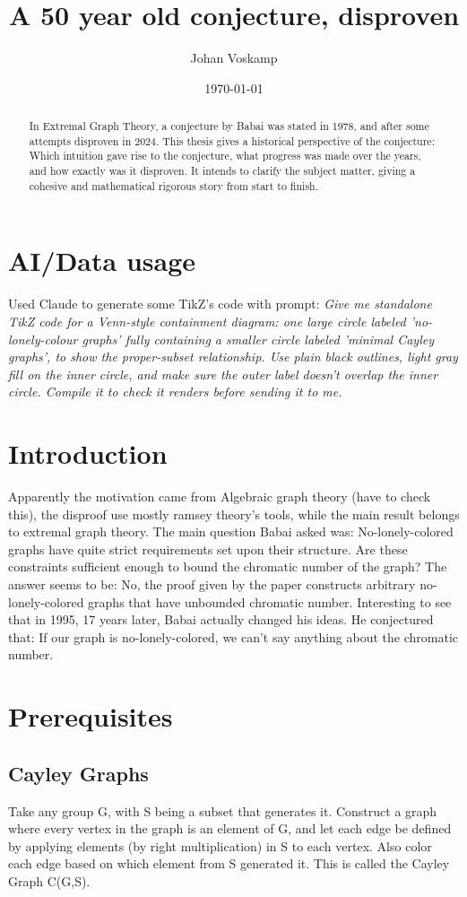 \documentclass[a4paper,10pt]{article}
\title{A 50 year old conjecture, disproven \todo{change title}}
\author{Johan Voskamp}
\date{\today}
\numberwithin{equation}{section}
\theoremstyle{definition}
\begin{document}
\maketitle

\begin{abstract}
    In Extremal Graph Theory, a conjecture by Babai was stated in 1978, and after some attempts disproven in 2024. This thesis gives a historical perspective of the conjecture: Which intuition gave rise to the conjecture, what progress was made over the years, and how exactly was it disproven. It intends to clarify the subject matter, giving a cohesive
    and mathematical rigorous story from start to finish.
\end{abstract}
\section{AI/Data usage}
    Used Claude to generate some TikZ's code with prompt:
    \textit{Give me standalone TikZ code for a Venn-style containment diagram: one large circle labeled 'no-lonely-colour graphs' fully containing a smaller circle labeled 'minimal Cayley graphs', 
    to show the proper-subset relationship. Use plain black outlines, light gray fill on the inner circle, and make sure the outer label doesn't overlap the inner circle. Compile it to check it renders before sending it to me.}
\section{Introduction}
    Apparently the motivation came from Algebraic graph theory (have to check this), the disproof use mostly ramsey theory's tools, while the main result belongs to extremal graph theory.
    The main question Babai asked was: No-lonely-colored graphs have quite strict requirements set upon their structure. Are these constraints sufficient enough to bound the chromatic number of the graph?
    The answer seems to be: No, the proof given by the paper constructs arbitrary no-lonely-colored graphs that have unbounded chromatic number.
    Interesting to see that in 1995, 17 years later, Babai actually changed his ideas. He conjectured that: If our graph is no-lonely-colored, we can't say anything about the chromatic number.
\section{Prerequisites}
    \subsection{Cayley Graphs}
        Take any group G, with S being a subset that generates it. Construct a graph where every vertex in the graph is an element of G, and let each edge be defined by applying elements (by right multiplication) in S to each vertex. Also color each edge based on which element from S generated it.
        This is called the Cayley Graph C(G,S).
\end{document}
